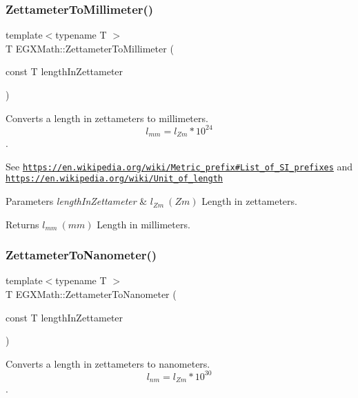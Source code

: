\subsubsection{\texorpdfstring{Zettameter\+To\+Millimeter()}{ZettameterToMillimeter()}}
{\footnotesize\ttfamily template$<$typename T $>$ \\
T E\+G\+X\+Math\+::\+Zettameter\+To\+Millimeter (\begin{DoxyParamCaption}\item[{const T}]{length\+In\+Zettameter }\end{DoxyParamCaption})}



Converts a length in zettameters to millimeters. \[ l_{mm}=l_{Zm} * 10^{24} \]. 

See \href{https://en.wikipedia.org/wiki/Metric_prefix#List_of_SI_prefixes}{\tt https\+://en.\+wikipedia.\+org/wiki/\+Metric\+\_\+prefix\#\+List\+\_\+of\+\_\+\+S\+I\+\_\+prefixes} and \href{https://en.wikipedia.org/wiki/Unit_of_length}{\tt https\+://en.\+wikipedia.\+org/wiki/\+Unit\+\_\+of\+\_\+length} 
\begin{DoxyParams}{Parameters}
{\em length\+In\+Zettameter} & $ l_{Zm}\ (Zm)$ Length in zettameters. \\
\hline
\end{DoxyParams}
\begin{DoxyReturn}{Returns}
$ l_{mm}\ (mm)$ Length in millimeters. 
\end{DoxyReturn}
\mbox{\label{group___e_g_x_math-_conversions-_length_conversions-_zettameter-_s_i_ga07934308bcd823e960e1c4be504e5afd}} 
\subsubsection{\texorpdfstring{Zettameter\+To\+Nanometer()}{ZettameterToNanometer()}}
{\footnotesize\ttfamily template$<$typename T $>$ \\
T E\+G\+X\+Math\+::\+Zettameter\+To\+Nanometer (\begin{DoxyParamCaption}\item[{const T}]{length\+In\+Zettameter }\end{DoxyParamCaption})}



Converts a length in zettameters to nanometers. \[ l_{nm}=l_{Zm} * 10^{30} \]. 

